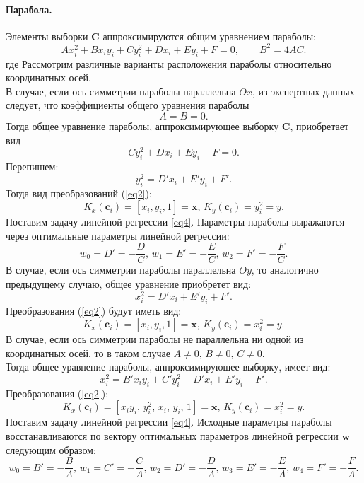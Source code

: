 \documentclass[12pt, twoside]{article}
\numberwithin{equation}{section}
\begin{document}
\paragraph{Парабола.} Элементы выборки $\mathbf{C}$ аппроксимируются общим уравнением параболы: 
\begin{equation} 
\label{24}
Ax_i^2 + Bx_iy_i + Cy_i^2 + Dx_i + Ey_i + F = 0, \qquad B^2 = 4AC.
\end{equation} где 
Рассмотрим различные варианты расположения параболы относительно координатных осей. \\
В случае, если ось симметрии параболы параллельна $Ox$, из экспертных данных следует, что коэффициенты общего уравнения параболы 
\begin{equation}
\label{25}
A = B = 0.
\end{equation}
Тогда общее уравнение параболы, аппроксимирующее выборку $\mathbf{C}$, приобретает вид \begin{equation}Cy_i^2 + Dx_i + Ey_i + F = 0 .\end{equation}
Перепишем: \begin{equation}y_i^2 = D'x_i + E'y_i + F'.\end{equation}
Тогда вид преобразований (\ref{eq2}): \begin{equation}K_{x}(\mathbf{c}_i) = [x_i, y_i, 1] = \mathbf{x}, \,  K_{y}(\mathbf{c}_i) = y_i^2 = y. \end{equation} 
Поставим задачу линейной регрессии \eqref{eq4}.
Параметры параболы выражаются через оптимальные параметры линейной регрессии: \begin{equation} w_0 = D' = -\frac{D}{C}, \,  w_1 = E' = -\frac{E}{C}, \,  w_2 = F' = -\frac{F}{C}.\end{equation}
В случае, если ось симметрии параболы параллельна $Oy$, то аналогично предыдущему случаю, общее уравнение приобретет вид: \begin{equation} x_i^2  = D'x_i + E'y_i + F'.\end{equation}
Преобразования (\ref{eq2}) будут иметь вид: \begin{equation}K_{x}(\mathbf{c}_i) = [x_i, y_i, 1] = \mathbf{x}, \,  K_{y}(\mathbf{c}_i) = x_i^2 = y. \end{equation}
В случае, если ось симметрии параболы не параллельна ни одной из координатных осей, то в таком случае $A \neq 0, \, B \neq 0, \, C \neq 0$. \\
Тогда общее уравнение параболы, аппроксимирующее выборку, имеет вид: \begin{equation} x_i^2 = B'x_iy_i + C'y_i^2 + D'x_i + E'y_i + F'.\end{equation}
Преобразования (\ref{eq2}): \begin{equation} K_{x}(\mathbf{c}_i) = [x_iy_i, \, y_i^2, \, x_i, \, y_i, \, 1] = \mathbf{x}, \,  K_{y}(\mathbf{c}_i) = x_i^2 = y.\end{equation}
Поставим задачу линейной регрессии \eqref{eq4}.
Исходные параметры параболы восстанавливаются по вектору оптимальных параметров линейной регрессии $\mathbf{w}$следующим образом: \begin{equation} w_0 = B' = -\frac{B}{A}, \, w_1 = C' = -\frac{C}{A}, \, w_2 = D' = -\frac{D}{A}, \, w_3 = E' = -\frac{E}{A}, \, w_4 = F' = -\frac{F}{A}.\end{equation}
\end{document}
